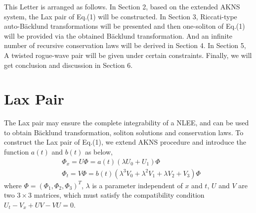 \documentclass[12pt]{article}
\begin{document}
This Letter is arranged as follows. In Section 2, based on the extended AKNS system, the Lax pair of Eq.(1) will be constructed. In Section 3, Riccati-type auto-B\"acklund transformations will be presented and then one-soliton of Eq.(1) will be provided via the obtained B\"acklund transformation. And an infinite number of recursive conservation laws will be derived in Section 4. In Section 5, A twisted rogue-wave pair will be given under certain constraints. Finally, we will get conclusion and discussion in Section 6.

\section{Lax Pair}
    The Lax pair may ensure the complete integrability of a NLEE, and can be used to obtain B\"acklund transformation, soliton solutions and conservation laws. To construct the Lax pair of Eq.(1), we extend AKNS procedure and introduce the function $a(t)$ and $b(t)$ as below,
\begin{align}
  & \Phi_{x} = U\Phi = a(t)(\lambda U_{0} + U_{1})\Phi \\
  & \Phi_{t} = V\Phi = b(t)(\lambda^{3}V_{0} + \lambda^{2}V_{1} + \lambda V_{2} + V_{3})\Phi
\end{align}
where $\Phi=(\Phi_{1}, \Phi_{2}, \Phi_{3})^{T}$, $\lambda$ is a parameter independent of $x$ and $t$, $U$ and $V$ are two $3 \times 3$ matrices, which must satisfy the compatibility condition $U_{t} - V_{x} + UV - VU = 0$.
\end{document}
